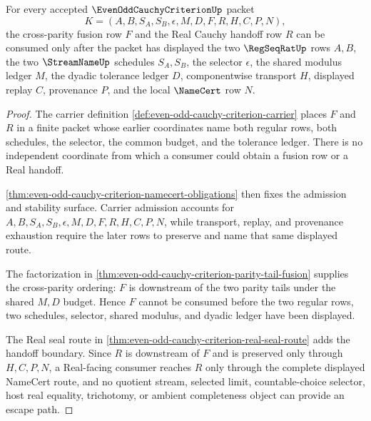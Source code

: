 \begin{theorem}
\label{thm:even-odd-cauchy-criterion-cross-parity-handoff-non-escape}
For every accepted $\EvenOddCauchyCriterionUp$ packet
$$
K=(A,B,S_A,S_B,\epsilon,M,D,F,R,H,C,P,N),
$$
the cross-parity fusion row $F$ and the Real Cauchy handoff row $R$ can be consumed only after the packet has displayed the two $\RegSeqRatUp$ rows $A,B$, the two $\StreamNameUp$ schedules $S_A,S_B$, the selector $\epsilon$, the shared modulus ledger $M$, the dyadic tolerance ledger $D$, componentwise transport $H$, displayed replay $C$, provenance $P$, and the local $\NameCert$ row $N$.
\end{theorem}
\begin{proof}
The carrier definition \autoref{def:even-odd-cauchy-criterion-carrier} places $F$ and $R$ in a finite packet whose earlier coordinates name both regular rows, both schedules, the selector, the common budget, and the tolerance ledger. There is no independent coordinate from which a consumer could obtain a fusion row or a Real handoff.

\autoref{thm:even-odd-cauchy-criterion-namecert-obligations} then fixes the admission and stability surface. Carrier admission accounts for $A,B,S_A,S_B,\epsilon,M,D,F,R,H,C,P,N$, while transport, replay, and provenance exhaustion require the later rows to preserve and name that same displayed route.

The factorization in \autoref{thm:even-odd-cauchy-criterion-parity-tail-fusion} supplies the cross-parity ordering: $F$ is downstream of the two parity tails under the shared $M,D$ budget. Hence $F$ cannot be consumed before the two regular rows, two schedules, selector, shared modulus, and dyadic ledger have been displayed.

The Real seal route in \autoref{thm:even-odd-cauchy-criterion-real-seal-route} adds the handoff boundary. Since $R$ is downstream of $F$ and is preserved only through $H,C,P,N$, a Real-facing consumer reaches $R$ only through the complete displayed NameCert route, and no quotient stream, selected limit, countable-choice selector, host real equality, trichotomy, or ambient completeness object can provide an escape path.
\end{proof}

